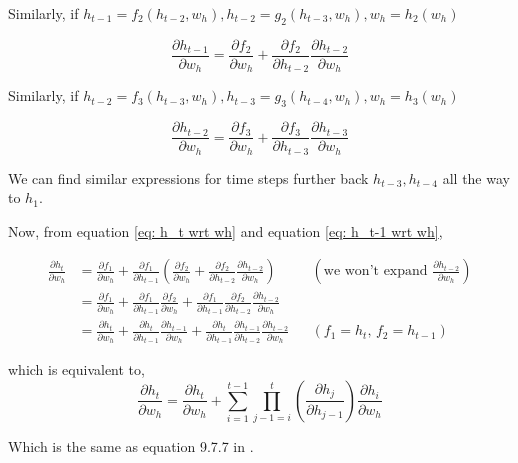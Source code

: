 \documentclass[12pt, letterpaper]{article}
\begin{document}
Similarly, if $h_{t-1} = f_2(h_{t-2}, w_h), h_{t-2}= g_2(h_{t-3}, w_h), w_h = h_2(w_h)$

\begin{equation}
    \frac{\partial h_{t-1}}{\partial w_h} = \frac{\partial f_2}{\partial w_h} + \frac{\partial f_2}{\partial h_{t-2}}\frac{\partial h_{t-2}}{\partial w_h}
    \label{eq: h_t-1 wrt wh}
\end{equation}

Similarly, if $h_{t-2} = f_3(h_{t-3}, w_h), h_{t-3}= g_3(h_{t-4}, w_h), w_h = h_3(w_h)$

\begin{equation}
    \frac{\partial h_{t-2}}{\partial w_h} = \frac{\partial f_3}{\partial w_h} + \frac{\partial f_3}{\partial h_{t-3}}\frac{\partial h_{t-3}}{\partial w_h}
    \label{eq: h_t-2 wrt wh}
\end{equation}

We can find similar expressions for time steps further back $h_{t-3}, h_{t-4}$ all the way to $h_1$.

Now, from equation \ref{eq: h_t wrt wh} and equation \ref{eq: h_t-1 wrt wh}, 

\begin{align}
    \frac{\partial h_t}{\partial w_h} &= \frac{\partial f_1}{\partial w_h} + \frac{\partial f_1}{\partial h_{t-1}}(\frac{\partial f_2}{\partial w_h} + \frac{\partial f_2}{\partial h_{t-2}}\frac{\partial h_{t-2}}{\partial w_h}) && (\text{we won't expand $\frac{\partial h_{t-2}}{\partial w_h}$}) \\
                                      &= \frac{\partial f_1}{\partial w_h} + \frac{\partial f_1}{\partial h_{t-1}}\frac{\partial f_2}{\partial w_h} + \frac{\partial f_1}{\partial h_{t-1}}\frac{\partial f_2}{\partial h_{t-2}}\frac{\partial h_{t-2}}{\partial w_h} \\
                                      &= \frac{\partial h_t}{\partial w_h} + \frac{\partial h_t}{\partial h_{t-1}}\frac{\partial h_{t-1}}{\partial w_h} + \frac{\partial h_t}{\partial h_{t-1}}\frac{\partial h_{t-1}}{\partial h_{t-2}}\frac{\partial h_{t-2}}{\partial w_h} && (\text{$f_1=h_t$, $f_2=h_{t-1}$})
\end{align}

which is equivalent to, 
\[
\boxed{\frac{\partial h_t}{\partial w_h} = \frac{\partial h_t}{\partial w_h} + \sum_{i=1}^{t-1}\prod_{j-1=i}^{t} (\frac{\partial h_j}{\partial h_{j-1}}) \frac{\partial h_i}{\partial w_h}
}
\]

Which is the same as equation 9.7.7 in \cite{d2l_bptt}.
\end{document}
